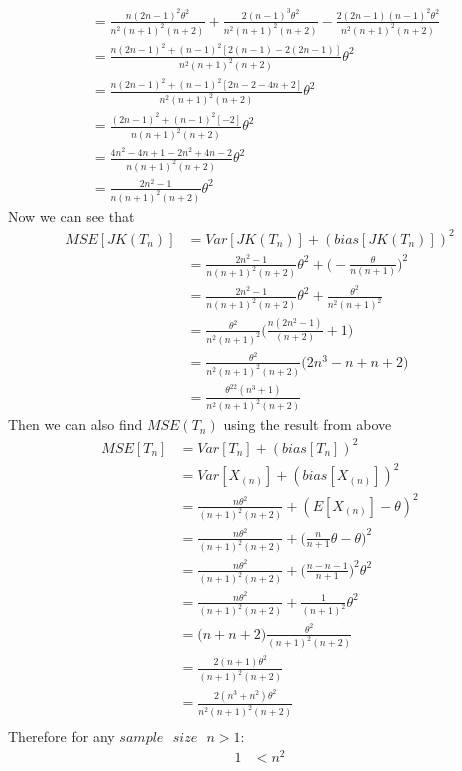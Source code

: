 \documentclass[a4paper,11pt]{article}
\begin{document}
\begin{enumerate}[a)]
\begin{enumerate}[i)]
\begin{align*}
	&= \frac{n(2n-1)^2\theta^2 }{n^2(n+1)^2(n+2)}+\frac{2(n-1)^3\theta^2 }{n^2(n+1)^2(n+2)}-\frac{2(2n-1)(n-1)^2\theta^2}{n^2(n+1)^2(n+2)}\\
	&= \frac{n(2n-1)^2+(n-1)^2[2(n-1) - 2(2n-1)]}{n^2(n+1)^2(n+2)}\theta^2\\
	&=  \frac{n(2n-1)^2+(n-1)^2[2n-2 - 4n+2]}{n^2(n+1)^2(n+2)}\theta^2\\
	&=  \frac{(2n-1)^2+(n-1)^2[ -2]}{n(n+1)^2(n+2)}\theta^2\\
	&= \frac{4n^2 -4n+1-2n^2+4n-2}{n(n+1)^2(n+2)}\theta^2\\
	&= \frac{2n^2 -1}{n(n+1)^2(n+2)}\theta^2
	\end{align*}
	Now we can see that
	\begin{align*}
	MSE[JK(T_n)] &= Var[JK(T_n)] + (bias[JK(T_n)])^2 \\
	&=\frac{2n^2 -1}{n(n+1)^2(n+2)}\theta^2  + \bigg( -\frac{\theta}{n(n+1)} \bigg)^2\\
	&=\frac{2n^2 -1}{n(n+1)^2(n+2)}\theta^2  + \frac{\theta^2}{n^2(n+1)^2}\\
	&=\frac{\theta^2}{n^2(n+1)^2}\bigg(\frac{n(2n^2 -1)}{(n+2)}  + 1\bigg)\\
	&=\frac{\theta^2}{n^2(n+1)^2(n+2)}\bigg(2n^3 -n  + n+2 \bigg)\\
	&=\frac{\theta^22(n^3+1)}{n^2(n+1)^2(n+2)}
	\end{align*}
	Then we can also find $MSE(T_n)$ using the result from above
	\begin{align*}
	MSE[T_n] &= Var[T_n] + (bias[T_n])^2\\
	& =  Var[X_{(n)}] + (bias[X_{(n)}])^2\\
	&=  \frac{n\theta^2 }{(n+1)^2(n+2)} + (E[X_{(n)}]-\theta)^2\\
	&=    \frac{n\theta^2 }{(n+1)^2(n+2)} + \bigg( \frac{n}{n+1}\theta-\theta \bigg)^2\\
	&= \frac{n\theta^2 }{(n+1)^2(n+2)} + \bigg( \frac{n-n-1}{n+1}\bigg)^2\theta^2\\
	&= \frac{n\theta^2 }{(n+1)^2(n+2)} + \frac{1}{(n+1)^2}\theta^2\\
	&= \bigg( n  + n+2\bigg)\frac{\theta^2}{(n+1)^2(n+2)}\\	
	&= \frac{2(n+1)\theta^2}{(n+1)^2(n+2)}\\	
	&= \frac{2(n^3+n^2)\theta^2}{n^2(n+1)^2(n+2)}\\	
	\end{align*}
	Therefore for any $sample\mbox{ } size\mbox{ } n>1$:
	\begin{align*}
		1 &<n^2 \\

\end{align*}
\end{enumerate}
\end{enumerate}
\end{document}
